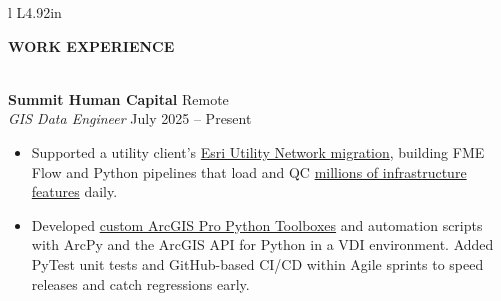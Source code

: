 \documentclass[letterpaper]{article}
\newcommand{\lineunder} {
        \vspace*{-8pt} \\
        \hspace*{-18pt} \hrulefill \\
    }
\newcommand{\header} [1] {
        \vspace{9pt}
        {\hspace*{-18pt}\vspace*{6pt} \large \textbf {#1}}
        \vspace*{-6pt} \lineunder
        \vspace{2pt}
    }
\newcommand{\employer}[4]{
        \vspace{3pt}
        \textbf{#1}  %
        \hfill #2\\  %
        \textit{#3}  %
        \hfill #4\\  %
        \vspace{3mm}
    }
\newenvironment{jobtasklist}
        {
            \vspace{-12pt}
            \begin{itemize} \itemsep 0pt
        }{
            \end{itemize}
            \vspace{-3pt}
        }
\newenvironment{skillslist}
        {
            \hspace*{-0.07in}\begin{tabular}[t]{ l L{4.92in} }
        }{
            \end{tabular}
        }
\newcommand{\impt}[1]{\uline{#1}}
\begin{document}
\begin{skillslist}
    \end{skillslist}





\header{WORK EXPERIENCE}



\employer
    {Summit Human Capital}
    {Remote}
    {GIS Data Engineer}
    {July 2025 -- Present}

\begin{jobtasklist}
    \item Supported a utility client's \impt{Esri Utility Network migration}, building FME Flow
            and Python pipelines that load and QC \impt{millions of infrastructure features} daily.
    \item Developed \impt{custom ArcGIS Pro Python Toolboxes} and automation scripts
            with ArcPy and the ArcGIS API for Python in a VDI environment.
            Added PyTest unit tests and GitHub-based CI/CD within Agile sprints to speed
            releases and catch regressions early.
\end{jobtasklist}
\end{document}

